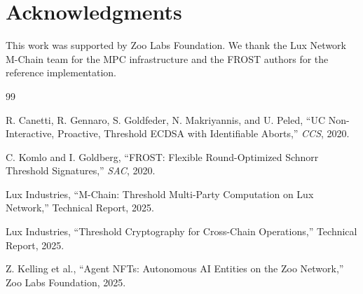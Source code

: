 \section*{Acknowledgments}


This work was supported by Zoo Labs Foundation. We thank the Lux Network M-Chain team for the MPC infrastructure and the FROST authors for the reference implementation.


\begin{thebibliography}{99}

R. Canetti, R. Gennaro, S. Goldfeder, N. Makriyannis, and U. Peled, ``UC Non-Interactive, Proactive, Threshold ECDSA with Identifiable Aborts,'' \textit{CCS}, 2020.

C. Komlo and I. Goldberg, ``FROST: Flexible Round-Optimized Schnorr Threshold Signatures,'' \textit{SAC}, 2020.

Lux Industries, ``M-Chain: Threshold Multi-Party Computation on Lux Network,'' Technical Report, 2025.

Lux Industries, ``Threshold Cryptography for Cross-Chain Operations,'' Technical Report, 2025.

Z. Kelling et al., ``Agent NFTs: Autonomous AI Entities on the Zoo Network,'' Zoo Labs Foundation, 2025.

\end{thebibliography}

